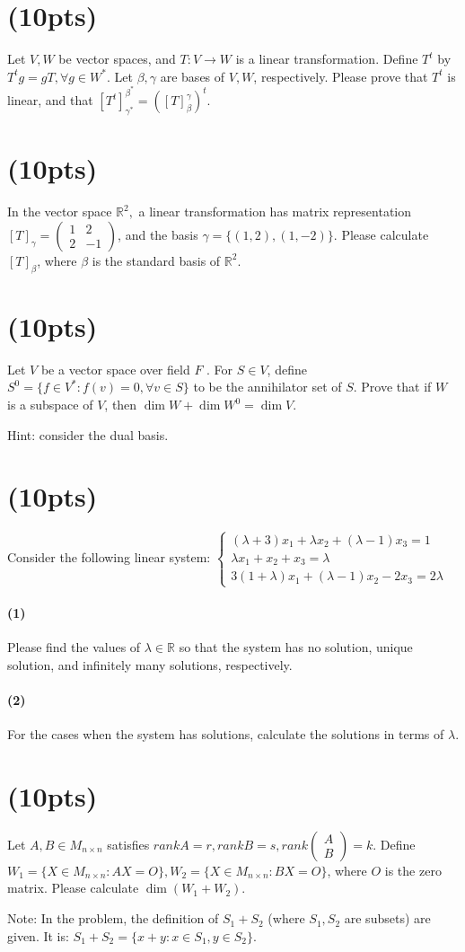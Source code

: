 \documentclass{article}
\begin{document}
\section{(10pts)}
Let $V,W$ be vector spaces, and $T:V\rightarrow W$ is a linear transformation. Define $T^t$ by $T^t g=gT,\forall g\in W^*$. Let $\beta,\gamma$ are bases of $V,W$, respectively. Please prove that $T^t$ is linear, and that $[T^t]_{\gamma^*}^{\beta^*}=([T]_{\beta}^{\gamma})^t$. 
\section{(10pts)}
In the vector space $\mathbb{R}^2,$ a linear transformation has matrix representation $[T]_\gamma=\begin{pmatrix}
    1&2\\2&-1
\end{pmatrix}$, and the basis $\gamma=\{(1,2),(1,-2)\}$. Please calculate $[T]_\beta$, where $\beta$ is the standard basis of $\mathbb{R}^2$.
\section{(10pts)}
Let $V$ be a vector space over field $F$ . For $S\in V$, define $S^0=\{f\in V^*: f(v)=0,\forall v\in S\}$ to be the annihilator set of $S$. Prove that if $W$ is a subspace of $V$, then $\dim W+\dim W^0=\dim V$.

Hint: consider the dual basis.
\section{(10pts)}
Consider the following linear system:
$\begin{cases} (\lambda+3)x_1+\lambda x_2+(\lambda -1)x_3=1\\ \lambda x_1+x_2+x_3=\lambda\\ 3(1+\lambda) x_1+(\lambda-1) x_2-2 x_3=2\lambda\end{cases}$
\paragraph{(1)}Please find the values of $\lambda\in \mathbb{R}$ so that the system has no solution, unique solution, and infinitely many solutions, respectively.
\paragraph{(2)} For the cases when the system has solutions, calculate the solutions in terms of $\lambda$.
\section{(10pts)}
Let $A,B\in M_{n\times n}$ satisfies $rank A=r,rank B=s,rank \begin{pmatrix}
    A\\B
\end{pmatrix}=k$. Define $W_1=\{X\in M_{n\times n}: AX=O\},W_2=\{X\in M_{n\times n}: BX=O\}$, where $O$ is the zero matrix. Please calculate $\dim(W_1+W_2)$.

Note: In the problem, the definition of $S_1+S_2$ (where $S_1,S_2$ are subsets) are given. It is: $S_1+S_2=\{x+y:x\in S_1,y\in S_2\}$.
\end{document}
